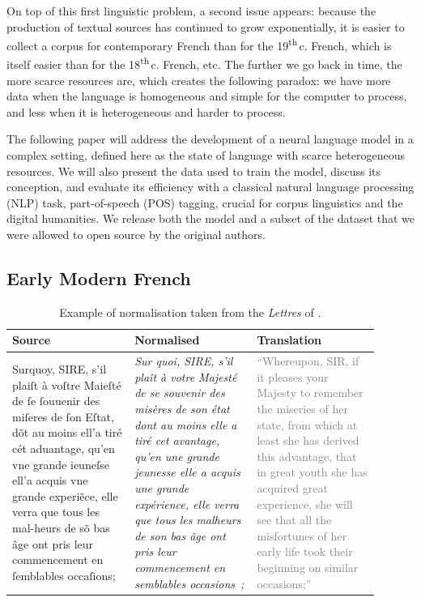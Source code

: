 On top of this first linguistic problem, a second issue appears: because the production of textual sources has continued to grow exponentially, it is easier to collect a corpus for contemporary French  than for the 19\textsuperscript{th}\,c. French, which is itself easier than for the 18\textsuperscript{th}\,c. French, etc. The further we go back in time, the more scarce resources are, which creates the following paradox: we have more data when the language is homogeneous and simple for the computer to process, and less when it is heterogeneous and harder to process.

The following paper will address the development of \dalembert a neural language model in a complex setting, defined here as the state of language with scarce heterogeneous resources. We will also present \freemmax the data used to train the model, discuss its conception, and evaluate its efficiency with a classical natural language processing (NLP) task, part-of-speech (POS) tagging, crucial for corpus linguistics and the digital humanities. We release both the \dalembert model and a subset of the \freemmax dataset that we were allowed to open source by the original authors.

\subsection{Early Modern French}\label{def:early}

\begin{table}[!htp]
    \centering\small
    \begin{tabular}{@{}p{0.3\linewidth}p{0.3\linewidth}p{0.3\linewidth}@{}}
        \toprule
        Source                                                                                                                                                                                                                                                                                               & Normalised & Translation \\
        \midrule
        Surquoy, SIRE, s’il plaiſt à voſtre Maieſté de ſe ſouuenir des miſeres de ſon Eſtat, dõt au moins ell’a tiré cét aduantage, qu’en vne grande ieuneſse ell’a acquis vne grande experi\~ece, elle verra que tous les mal-heurs de sõ bas âge ont pris leur commencement en ſemblables occaſions;       &
        \emph{Sur quoi, SIRE, s’il plaît à votre Majesté de se souvenir des misères de son état dont au moins elle a tiré cet avantage, qu’en une grande jeunesse elle a acquis une grande expérience, elle verra que tous les malheurs de son bas âge ont pris leur commencement en semblables occasions~;} &
        \textcolor{gray}{``Whereupon, SIR, if it pleases your Majesty to remember the miseries of her state, from which at least she has derived this advantage, that in great youth she has acquired great experience, she will see that all the misfortunes of her early life took their beginning on similar occasions;''}           \\
        \bottomrule
    \end{tabular}
    \caption{\label{tab:norm_examples}Example of normalisation taken from the \emph{Lettres} of \protect{}.}
\end{table}

